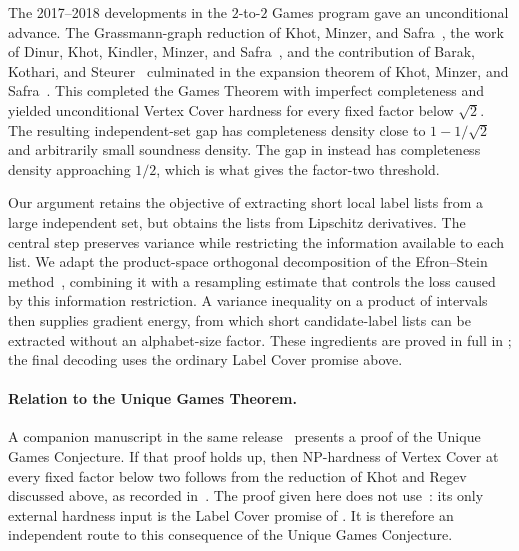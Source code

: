 The 2017--2018 developments in the \(2\)-to-\(2\) Games program
gave an unconditional advance. The Grassmann-graph reduction of Khot, Minzer, and
Safra~\cite{KhotMinzerSafra2025}, the work of Dinur, Khot, Kindler,
Minzer, and Safra~\cite{DKKMS2025}, and the contribution of Barak,
Kothari, and Steurer~\cite{BarakKothariSteurer2019} culminated in
the expansion theorem of Khot, Minzer, and
Safra~\cite{KhotMinzerSafra2023}. This completed the Games Theorem
with imperfect completeness and yielded unconditional Vertex Cover
hardness for every fixed factor below \(\sqrt2\). The resulting
independent-set gap has completeness density close to
\(1-1/\sqrt2\) and arbitrarily small soundness density. The gap
in  instead has completeness density approaching
\(1/2\), which is what gives the factor-two threshold.

Our argument retains the objective of extracting short local label
lists from a large independent set, but obtains the lists from
Lipschitz derivatives. The central step preserves variance while
restricting the information available to each list. We adapt the
product-space orthogonal decomposition of the Efron--Stein
method~\cite[Section~2]{EfronStein1981}, combining it with a
resampling estimate that controls the loss caused by this information
restriction. A variance inequality on a product of intervals then
supplies gradient energy, from which short candidate-label lists can
be extracted without an alphabet-size factor. These ingredients
are proved in full in ;
the final decoding uses the ordinary Label Cover promise above.

\paragraph{Relation to the Unique Games Theorem.}
A companion manuscript in the same release~\cite{OpenAIUniqueGames2026}
presents a proof of the Unique Games Conjecture. If that proof holds up,
then NP-hardness of Vertex Cover at every fixed factor below two
follows from the reduction of Khot and
Regev~\cite{KhotRegev2008} discussed above, as recorded
in~\cite[Section~8]{OpenAIUniqueGames2026}. The proof given here does not
use~\cite{OpenAIUniqueGames2026}: its only external hardness input is
the Label Cover promise of . It is therefore an
independent route to this consequence of the Unique Games Conjecture.
